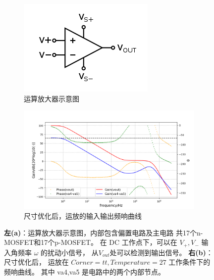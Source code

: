\begin{figure}[htbp]
  \centering
  \begin{subfigure}{0.3\textwidth}
    \includegraphics[width=\textwidth]{fig/amplifier-diagram.png}
    \caption{运算放大器示意图\cite{OpAmpPNG}}
    \label{subfig:amplifier-diagram}
  \end{subfigure}
  \begin{subfigure}{0.65\textwidth}
    \includegraphics[width=\textwidth]{fig/amplifier-transfer-function.png}
    \caption{尺寸优化后，运放的输入输出频响曲线}
    \label{subfig:amplifier-transfer-function}
  \end{subfigure}
  \caption{\textbf{左(a)}：运算放大器示意图，内部包含偏置电路及主电路
  共17个n-MOSFET和17个p-MOSFET。
  在 DC 工作点下，可以在 $V_+,V_-$ 输入角频率 $\omega$ 的扰动小信号，
  从$V_{out}$处可以检测到输出信号。 \textbf{右(b)}：尺寸优化后，
  运放在 $Corner=tt,Temperature=27$
  工作条件下的频响曲线。 其中 va4,va5 是电路中的两个内部节点。}
\end{figure}
